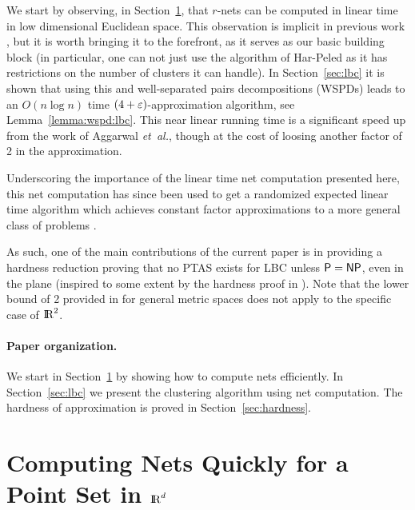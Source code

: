 \ifx\STACS\undefined \documentclass[12pt]{article}\else \documentclass[runningheads,a4paper]{llncs}
\newcommand{\WSPD}{\Term{WSPD}\index{well-separated pair
      decomposition}\xspace}
\newcommand{\lbc}{\PStyle{LBC}\xspace}
\newcommand{\PTAS}{\Term{P{T}AS}\xspace}
\newcommand{\PStyle}[1]{\textcolor{red25}{\textrm{\textsf{#1}}}}
\newcommand{\Term}[1]{\textsf{#1}}
\renewcommand{\Re}{{\rm I\!\hspace{-0.025em} R}}
\newcommand{\seclab}[1]{\label{sec:#1}}
\newcommand{\secref}[1]{Section~\ref{sec:#1}}
\newcommand{\lemref}[1]{Lemma~\ref{lemma:#1}}
\newcommand{\etal}{\textit{et~al.}\xspace}
\begin{document}
We start by observing, in \secref{compNets}, that $r$-nets can be
computed in linear time in low dimensional Euclidean space.  This
observation is implicit in previous work \cite{h-cm-04}, but it is
worth bringing it to the forefront, as it serves as our basic
building block (in particular, one can not just use the algorithm of
Har-Peled \cite{h-cm-04} as it has restrictions on the number of
clusters it can handle). 
In \secref{lbc} it is shown that using this and well-separated pairs
decompositions (\WSPD{}s) leads to an $O(n \log n)$ time
$(4+\varepsilon)$-approximation algorithm, see \lemref{wspd:lbc}.  
This near linear running time is a significant speed up from the work of 
Aggarwal \etal \cite{apftkkz-aac-10}, though at the cost of 
loosing another factor of 2 in the approximation.

Underscoring the importance of the linear time net computation 
presented here, this net computation has since been used 
to get a randomized expected linear time algorithm which 
achieves constant factor approximations to a more general class of 
problems \cite{hr-nplta-13}.  

As such, one of the main contributions of the current paper is in 
providing a hardness reduction proving that no \PTAS exists for \lbc unless 
$\P = \NP$, even in the plane (inspired to some extent by
the hardness proof in \cite{fg-oafac-88}). Note that the lower bound
of 2 provided in \cite{apftkkz-aac-10} for general metric spaces does
not apply to the specific case of $\Re^2$.

  




\paragraph*{Paper organization.} We start in \secref{compNets} by showing how to compute nets
efficiently.  In \secref{lbc} we present the clustering algorithm
using net computation.  The hardness of approximation is proved in
\secref{hardness}.













\section{Computing Nets Quickly for a Point Set in $\Re^d$}
\seclab{compNets}
\end{document}
